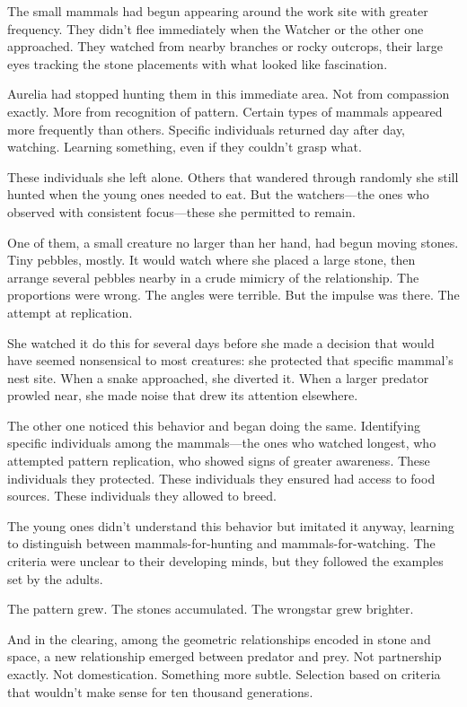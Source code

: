 \scenebreak

The small mammals had begun appearing around the work site with greater frequency. They didn't flee immediately when the Watcher or the other one approached. They watched from nearby branches or rocky outcrops, their large eyes tracking the stone placements with what looked like fascination.

Aurelia had stopped hunting them in this immediate area. Not from compassion exactly. More from recognition of pattern. Certain types of mammals appeared more frequently than others. Specific individuals returned day after day, watching. Learning something, even if they couldn't grasp what.

These individuals she left alone. Others that wandered through randomly she still hunted when the young ones needed to eat. But the watchers—the ones who observed with consistent focus—these she permitted to remain.

One of them, a small creature no larger than her hand, had begun moving stones. Tiny pebbles, mostly. It would watch where she placed a large stone, then arrange several pebbles nearby in a crude mimicry of the relationship. The proportions were wrong. The angles were terrible. But the impulse was there. The attempt at replication.

She watched it do this for several days before she made a decision that would have seemed nonsensical to most creatures: she protected that specific mammal's nest site. When a snake approached, she diverted it. When a larger predator prowled near, she made noise that drew its attention elsewhere.

The other one noticed this behavior and began doing the same. Identifying specific individuals among the mammals—the ones who watched longest, who attempted pattern replication, who showed signs of greater awareness. These individuals they protected. These individuals they ensured had access to food sources. These individuals they allowed to breed.

The young ones didn't understand this behavior but imitated it anyway, learning to distinguish between mammals-for-hunting and mammals-for-watching. The criteria were unclear to their developing minds, but they followed the examples set by the adults.

The pattern grew. The stones accumulated. The wrongstar grew brighter.

And in the clearing, among the geometric relationships encoded in stone and space, a new relationship emerged between predator and prey. Not partnership exactly. Not domestication. Something more subtle. Selection based on criteria that wouldn't make sense for ten thousand generations.

